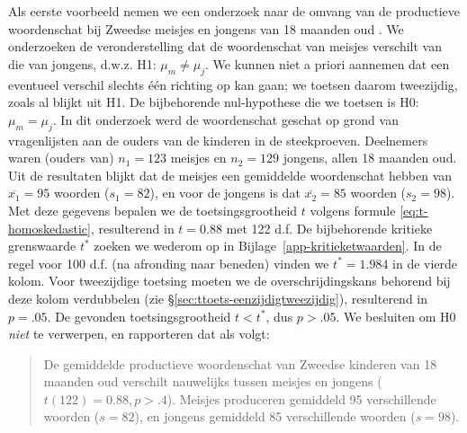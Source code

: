 \documentclass[
]{book}
\begin{document}
Als eerste voorbeeld nemen we een onderzoek naar de omvang van de
productieve woordenschat bij Zweedse meisjes en jongens van 18 maanden
oud \citep{Ande11}. We onderzoeken de veronderstelling dat de woordenschat
van meisjes verschilt van die van jongens, d.w.z. H1: \(\mu_m \ne \mu_j\).
We kunnen niet a priori aannemen dat een eventueel verschil slechts één
richting op kan gaan; we toetsen daarom tweezijdig, zoals al blijkt uit
H1. De bijbehorende nul-hypothese die we toetsen is H0: \(\mu_m = \mu_j\).
In dit onderzoek werd de woordenschat geschat op grond van vragenlijsten
aan de ouders van de kinderen in de steekproeven. Deelnemers waren
(ouders van) \(n_1=123\) meisjes en \(n_2=129\) jongens, allen 18 maanden
oud. Uit de resultaten blijkt dat de meisjes een gemiddelde woordenschat
hebben van \(\overline{x_1}=95\) woorden (\(s_1=82\)), en voor de jongens is
dat \(\overline{x_2}=85\) woorden (\(s_2=98\)). Met deze gegevens bepalen we
de toetsingsgrootheid \(t\) volgens formule \eqref{eq:t-homoskedastic},
resulterend in \(t=0.88\) met 122 d.f. De bijbehorende kritieke
grenswaarde \(t^*\) zoeken we wederom op in
Bijlage~\ref{app-kritieketwaarden}. In de regel voor 100 d.f. (na
afronding naar beneden) vinden we \(t^*=1.984\) in de vierde kolom. Voor
tweezijdige toetsing moeten we de overschrijdingskans behorend bij deze
kolom verdubbelen (zie §\ref{sec:ttoets-eenzijdigtweezijdig}),
resulterend in \(p=.05\). De gevonden toetsingsgrootheid \(t < t^*\), dus
\(p>.05\). We besluiten om H0 \emph{niet} te verwerpen, en rapporteren dat als
volgt:

\begin{quote}
De gemiddelde productieve woordenschat van Zweedse kinderen van 18
maanden oud verschilt nauwelijks tussen meisjes en jongens
(\(t(122)=0.88, p>.4\)). Meisjes produceren gemiddeld 95 verschillende
woorden (\(s=82\)), en jongens gemiddeld 85 verschillende woorden
(\(s=98\)).
\end{quote}
\end{document}
